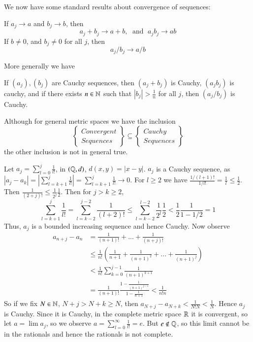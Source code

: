 We now have some standard results about convergence of sequences:

\begin{prop}\label{prop:1.5.1}
    If $a_j\rightarrow a$ and $b_j\rightarrow b$, then $$a_j+b_j\rightarrow a+b,\;\text{ and }\;a_jb_j\rightarrow ab$$ If $b \neq 0$, and $b_j \neq 0$ for all $j$, then $$a_j/b_j\rightarrow a/b$$
\end{prop}

More generally we have 
\begin{defn}
    If $(a_j),(b_j)$ are Cauchy sequences, then $(a_j+b_j)$ is Cauchy, $(a_jb_j)$ is cauchy, and if there exists $n \in \mathbb N$ such that $|b_j| > \frac{1}{n}$ for all $j$, then $(a_j/b_j)$ is Cauchy.
\end{defn}

Although for general metric spaces we have the inclusion $$\left\{\begin{array}{cc} Convergent \\ Sequences\end{array}\right\} \subseteq \left\{\begin{array}{cc} Cauchy \\ Sequences \end{array}\right\}$$
the other inclusion is not in general true.

\begin{eg}
    Let $a_j = \sum_{l=0}^j\frac{1}{l!}$, in $(\mathbb Q, d)$, $d(x,y) = |x-y|$. $a_j$ is a Cauchy sequence, as $|a_j - a_k| = \left|\sum_{l=k+1}^j\frac{1}{l!}\right| = \sum_{l=k+1}^j\frac{1}{l!}\rightarrow 0$. For $l\geq 2$ we have $\frac{1/(l+1)!}{1/l!} = \frac{1}{l} \leq \frac{1}{2}$. Then $\frac{1}{(2+j)!} \leq \frac{1}{2^j}\frac{1}{2}$. Then for $j > k \geq 2$, $$\sum_{l=k+1}^j\frac{1}{l!} = \sum_{l=k-2}^{j-2}\frac{1}{(l+2)!} \leq \sum_{l=k-2}^{l-2}\frac{1}{2^l}\frac{1}{2} < \frac{1}{2}\frac{1}{1-1/2} = 1$$ Thus, $a_j$ is a bounded increasing sequence and hence Cauchy. Now observe \begin{align*}
        a_{n+j}-a_n &= \frac{1}{(n+1)!} + ... + \frac{1}{(n+j)!} \\
        &\leq \frac{1}{n!}\left(\frac{1}{n+1}+ \frac{1}{(n+1)^2} + ... + \frac{1}{(n+1)^j}\right) \\
        &< \frac{1}{n!}\sum_{k=0}^{j-1}\frac{1}{(n+1)^{k+1}} \\
        &= \frac{1}{(n+1)!}\frac{1-\frac{1}{(n+1)^{j-1}}}{1-\frac{1}{n+1}} < \frac{1}{n!n}
    \end{align*}
    So if we fix $N \in \mathbb N$, $N+j > N+k \geq N$, then $a_{N+j} - a_{N+k} < \frac{1}{N!N} < \frac{1}{N}$. Hence $a_j$ is Cauchy. Since it is Cauchy, in the complete metric space $\mathbb R$ it is convergent, so let $a = \lim a_j$, so we observe $a = \sum_{l=0}^{\infty}\frac{1}{l!} = e$. But $e \notin \mathbb Q$, so this limit cannot be in the rationals and hence the rationals is not complete. 
\end{eg}

